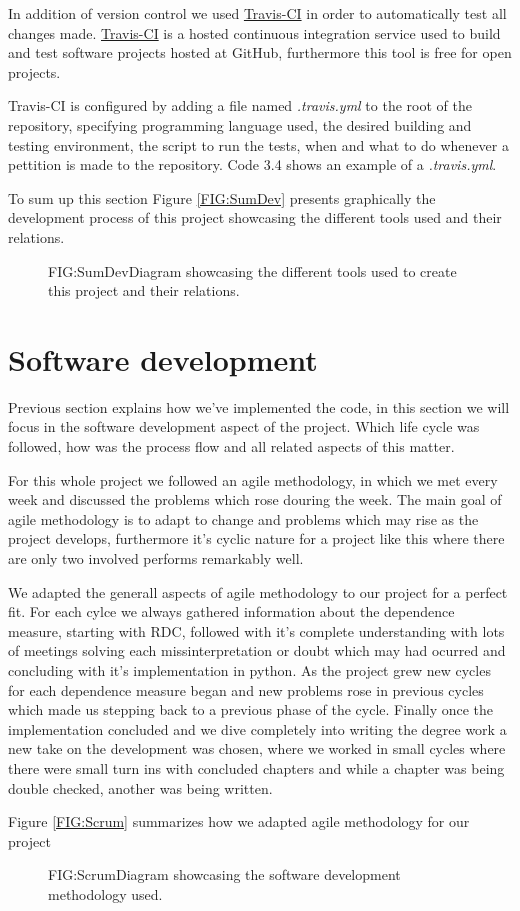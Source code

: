 In addition of version control we used \href{https://travis-ci.org/}{Travis-CI} in order to automatically test all changes made. \href{https://github.com/travis-ci/travis-ci/blob/master/README.md}{Travis-CI} is a hosted continuous integration service used to build and test software projects hosted at GitHub, furthermore this tool is free for open projects.

Travis-CI is configured by adding a file named \textit{.travis.yml} to the root of the repository, specifying programming language used, the desired building and testing environment, the script to run the tests, when and what to do whenever a pettition is made to the repository. Code 3.4 shows an example of a \textit{.travis.yml}.

\label{CODE:TRAVIS}


To sum up this section Figure \ref{FIG:SumDev} presents graphically the development process of this project showcasing the different tools used and their relations.

\begin{figure}[Summary of the implementation process]{FIG:SumDev}{Diagram showcasing the different tools used to create this project and their relations.}
\end{figure}
\FloatBarrier
\section{Software development}

Previous section explains how we've implemented the code, in this section we will focus in the software development aspect of the project. Which life cycle was followed, how was the process flow and all related aspects of this matter.

For this whole project we followed an agile methodology, in which we met every week and discussed the problems which rose douring the week. The main goal of agile methodology is to adapt to change and problems which may rise as the project develops, furthermore it's cyclic nature for a project like this where there are only two involved performs remarkably well. 

We adapted the generall aspects of agile methodology to our project for a perfect fit. For each cylce we always gathered information about the dependence measure, starting with RDC, followed with it's complete understanding with lots of meetings solving each missinterpretation or doubt which may had ocurred and concluding with it's implementation in python.  As the project grew new cycles for each dependence measure began and new problems rose in previous cycles which made us stepping back to a previous phase of the cycle. Finally once the implementation concluded and we dive completely into writing the degree work a new take on the development was chosen, where we worked in small cycles where there were small turn ins with concluded chapters and while a chapter was being double checked, another was being written.

Figure \ref{FIG:Scrum} summarizes how we adapted agile methodology for our project
\begin{figure}[Summary of the development process]{FIG:Scrum}{Diagram showcasing the software development methodology used.}
\end{figure}

